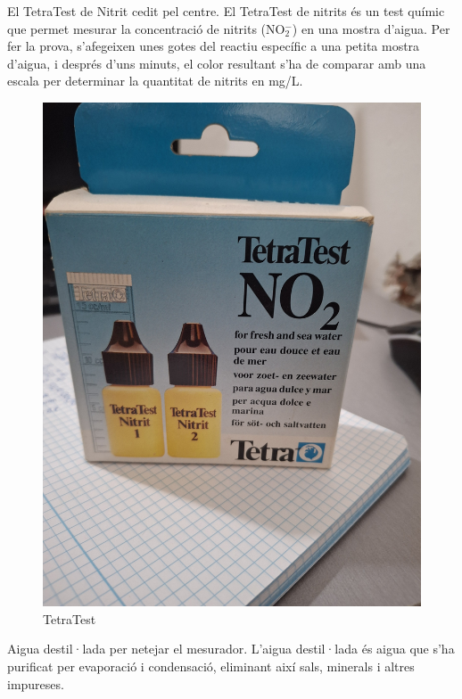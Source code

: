\begin{enumerate}
\begin{minipage}[h]{0.6\textwidth}
\item El TetraTest de Nitrit cedit pel centre. El TetraTest de nitrits és un test químic que permet mesurar la concentració de nitrits (NO$_2^-$) en una mostra d’aigua. Per fer la prova, s’afegeixen unes gotes del reactiu específic a una petita mostra d’aigua, i després d’uns minuts, el color resultant s’ha de comparar amb una escala per determinar la quantitat de nitrits en mg/L.
\end{minipage}
\begin{minipage}[h]{0.35\textwidth}
\begin{figure}[H]
\centering
\includegraphics[width=1\textwidth, angle=270]{./Figures/TetraTest.png}
\caption{TetraTest}
\label{fig:TetraTestdeNitrit}
\end{figure}
\end{minipage}

 \item Aigua destil·lada per netejar el mesurador. L’aigua destil·lada és aigua que s’ha purificat per evaporació i condensació, eliminant així sals, minerals i altres impureses.


\end{enumerate}
